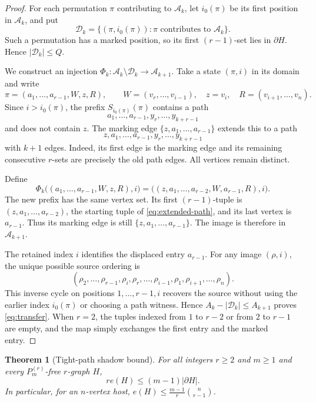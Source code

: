 \documentclass[11pt]{article}
\numberwithin{equation}{section}
\newtheorem{theorem}{Theorem}[section]
\theoremstyle{definition}
\newcommand{\cA}{\mathcal A}
\newcommand{\cD}{\mathcal D}
\begin{document}
\begin{proof}
For each permutation $\pi$ contributing to $\cA_k$, let $i_0(\pi)$
be its first position in $\cA_k$, and put
\[
 \cD_k=\{(\pi,i_0(\pi)):\pi\text{ contributes to }\cA_k\}.
\]
Such a permutation has a marked position, so its first $(r-1)$-set
lies in $\partial H$.  Hence $|\cD_k|\leq Q$.

We construct an injection $\Phi_k:\cA_k\setminus\cD_k\to\cA_{k+1}$.
Take a state $(\pi,i)$ in its domain and write
\[
 \pi=(a_1,\ldots,a_{r-1},W,z,R),\qquad
 W=(v_r,\ldots,v_{i-1}),\quad z=v_i,\quad
 R=(v_{i+1},\ldots,v_n).
\]
Since $i>i_0(\pi)$, the prefix $S_{i_0(\pi)}(\pi)$ contains a path
\[
 a_1,\ldots,a_{r-1},y_r,\ldots,y_{k+r-1}
\]
and does not contain $z$.  The marking edge
$\{z,a_1,\ldots,a_{r-1}\}$ extends this to a path
\begin{equation}
 z,a_1,\ldots,a_{r-1},y_r,\ldots,y_{k+r-1}
 \label{eq:extended-path}
\end{equation}
with $k+1$ edges.  Indeed, its first edge is the marking edge and its
remaining consecutive $r$-sets are precisely the old path edges.
All vertices remain distinct.

Define
\begin{equation}
 \Phi_k\bigl((a_1,\ldots,a_{r-1},W,z,R),i\bigr)
       =\bigl((z,a_1,\ldots,a_{r-2},W,a_{r-1},R),i\bigr).
 \label{eq:cycle-map}
\end{equation}
The new prefix has the same vertex set.  Its first $(r-1)$-tuple is
$(z,a_1,\ldots,a_{r-2})$, the starting tuple of
\eqref{eq:extended-path}, and its last vertex is $a_{r-1}$.
Thus its marking edge is still $\{z,a_1,\ldots,a_{r-1}\}$.
The image is therefore in $\cA_{k+1}$.

The retained index $i$ identifies the displaced entry $a_{r-1}$.
For any image $(\rho,i)$, the unique possible source ordering is
\begin{equation}
 (\rho_2,\ldots,\rho_{r-1},\rho_i,\rho_r,\ldots,\rho_{i-1},\rho_1,
       \rho_{i+1},\ldots,\rho_n).
 \label{eq:inverse}
\end{equation}
This inverse cycle on positions $1,\ldots,r-1,i$ recovers the source
without using the earlier index $i_0(\pi)$ or choosing a path witness.
Hence $A_k-|\cD_k|\leq A_{k+1}$ proves \eqref{eq:transfer}.
When $r=2$, the tuples indexed from $1$ to $r-2$ or from $2$ to
$r-1$ are empty, and the map simply exchanges the first entry and
the marked entry.
\end{proof}

\begin{theorem}[Tight-path shadow bound]
\label{thm:path-shadow}
For all integers $r\geq2$ and $m\geq1$ and every
$P_m^{(r)}$-free $r$-graph $H$,
\begin{equation}
 r e(H)\leq(m-1)|\partial H|.
 \label{eq:shadow-bound}
\end{equation}
In particular, for an $n$-vertex host,
$e(H)\leq\frac{m-1}{r}\binom n{r-1}$.
\end{theorem}
\end{document}
